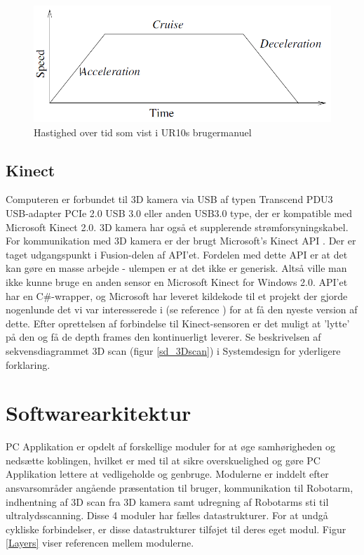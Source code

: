 \begin{figure}[H]
    \centering
    \includegraphics[width=1\textwidth]{figurer/d/movel_velocity}
    \caption{Hastighed over tid som vist i UR10s brugermanuel}
    \label{ur10velocity}
\end{figure}


\subsection{Kinect}
Computeren er forbundet til 3D kamera via USB af typen Transcend PDU3 USB-adapter PCIe 2.0 USB 3.0 eller anden USB3.0 type, der er kompatible med Microsoft Kinect 2.0. 3D kamera har også et supplerende strømforsyningskabel.
For kommunikation med 3D kamera er der brugt Microsoft's Kinect API \cite{KinectAPI} .
Der er taget udgangspunkt i Fusion-delen \cite{KinectFusion} af API'et. Fordelen med dette API er at det kan gøre en masse arbejde - ulempen er at det ikke er generisk. Altså ville man ikke kunne bruge en anden sensor en Microsoft Kinect for Windows 2.0. API'et har en C\#-wrapper, og Microsoft har leveret kildekode til et projekt der gjorde nogenlunde det vi var interesserede i (se reference \cite{KinectFusionExplorer}) for at få den nyeste version af dette.
Efter oprettelsen af forbindelse til Kinect-sensoren er det muligt at 'lytte' på den og få de depth frames den kontinuerligt leverer. Se beskrivelsen af sekvensdiagrammet 3D scan (figur \ref{sd_3Dscan}) i Systemdesign for yderligere forklaring.

\newpage

\section{Softwarearkitektur}
PC Applikation er opdelt af forskellige moduler for at øge samhørigheden og nedsætte koblingen, hvilket er med til at sikre overskuelighed og gøre PC Applikation lettere at vedligeholde og genbruge. Modulerne er inddelt efter ansvarsområder angående præsentation til bruger, kommunikation til Robotarm, indhentning af 3D scan fra 3D kamera samt udregning af Robotarms sti til ultralydsscanning. Disse 4 moduler har fælles datastrukturer. For at undgå cykliske forbindelser, er disse datastrukturer tilføjet til deres eget modul. Figur \ref{Layers} viser referencen mellem modulerne. 


